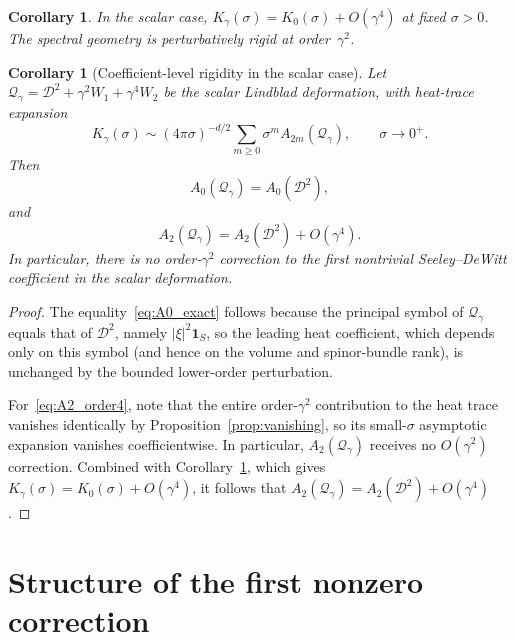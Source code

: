 \documentclass[11pt,a4paper]{article}
\numberwithin{equation}{section}
\newtheorem{Corollary}[Theorem]{Corollary}
\theoremstyle{definition}
\newcommand{\cD}{\mathcal{D}}
\newcommand{\Qg}{\mathcal{Q}_\gamma}
\begin{document}
\begin{Corollary}
\label{cor:rigidity}
In the scalar case, $K_\gamma(\sigma) = K_0(\sigma) + O(\gamma^4)$
at fixed $\sigma > 0$. The spectral geometry is perturbatively rigid
at order~$\gamma^2$.
\end{Corollary}

\begin{Corollary}[Coefficient-level rigidity in the scalar case]
\label{cor:SDW}
Let $\Qg=\cD^2+\gamma^2W_1+\gamma^4W_2$ be the scalar Lindblad
deformation, with heat-trace expansion
\begin{equation}
K_\gamma(\sigma)\sim (4\pi\sigma)^{-d/2}\sum_{m\ge 0}\sigma^m A_{2m}(\Qg),
\qquad \sigma\to 0^+.
\label{eq:SDW_expansion}
\end{equation}
Then
\begin{equation}
A_0(\Qg)=A_0(\cD^2),
\label{eq:A0_exact}
\end{equation}
and
\begin{equation}
A_2(\Qg)=A_2(\cD^2)+O(\gamma^4).
\label{eq:A2_order4}
\end{equation}
In particular, there is no order-$\gamma^2$ correction to the first
nontrivial Seeley--DeWitt coefficient in the scalar deformation.
\end{Corollary}

\begin{proof}
The equality~\eqref{eq:A0_exact} follows because the principal symbol of
$\Qg$ equals that of $\cD^2$, namely $|\xi|^2\mathbf{1}_S$, so the
leading heat coefficient, which depends only on this symbol (and hence
on the volume and spinor-bundle rank), is unchanged by the bounded
lower-order perturbation.

For~\eqref{eq:A2_order4}, note that the entire order-$\gamma^2$
contribution to the heat trace vanishes identically by
Proposition~\ref{prop:vanishing}, so its small-$\sigma$ asymptotic
expansion vanishes coefficientwise. In particular, $A_2(\Qg)$ receives no
$O(\gamma^2)$ correction. Combined with Corollary~\ref{cor:rigidity},
which gives $K_\gamma(\sigma)=K_0(\sigma)+O(\gamma^4)$, it follows that
$A_2(\Qg)=A_2(\cD^2)+O(\gamma^4)$.
\end{proof}

\section{Structure of the first nonzero correction}
\label{sec:gamma4}
\end{document}
